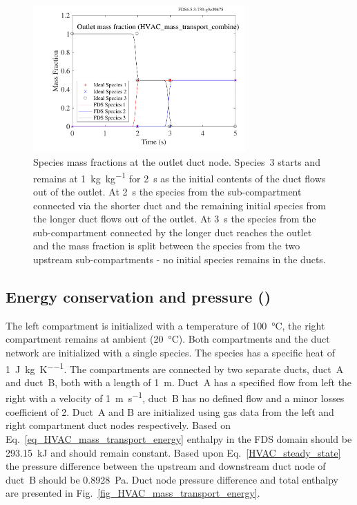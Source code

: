 \documentclass[11pt]{book}
\begin{document}
\begin{figure}[ht]
\centering
\includegraphics[width=3.2in]{SCRIPT_FIGURES/HVAC_mass_transport_combine}
\caption[ test case.]{Species mass fractions at the outlet duct node. Species~3 starts and remains at \SI[per-mode=symbol]{1}{\kilogram\per\kilogram} for \SI{2}{\second} as the initial contents of the duct flows out of the outlet. At \SI{2}{\second} the species from the sub-compartment connected via the shorter duct and the remaining initial species from the longer duct flows out of the outlet. At \SI{3}{\second} the species from the sub-compartment connected by the longer duct reaches the outlet and the mass fraction is split between the species from the two upstream sub-compartments - no initial species remains in the ducts.}
\label{fig_HVAC_mass_transport_combine}
\end{figure}

\subsection{Energy conservation and pressure (\texorpdfstring{}{HVAC\_mass\_transport\_energy})}
\label{HVAC_mass_transport_energy}
The left compartment is initialized with a temperature of \SI{100}{\degreeCelsius}, the right compartment remains at ambient (\SI{20}{\degreeCelsius}). Both compartments and the duct network are initialized with a single species. The species has a specific heat of \SI[per-mode=symbol]{1}{\joule\per\kilogram\per\kelvin}. The compartments are connected by two separate ducts, duct~A and duct~B, both with a length of \SI{1}{\meter}. Duct~A has a specified flow from left the right with a velocity of \SI[per-mode=symbol]{1}{\meter\per\second}, duct~B has no defined flow and a minor losses coefficient of \num{2}. Duct~A and B are initialized using gas data from the left and right compartment duct nodes respectively. Based on Eq.~\ref{eq_HVAC_mass_transport_energy} enthalpy in the FDS domain should be \SI{293.15}{\kilo\joule} and should remain constant. Based upon Eq.~\ref{HVAC_steady_state} the pressure difference between the upstream and downstream duct node of duct~B should be \SI{0.8928}{\pascal}. Duct node pressure difference and total enthalpy are presented in Fig.~\ref{fig_HVAC_mass_transport_energy}.
\end{document}
